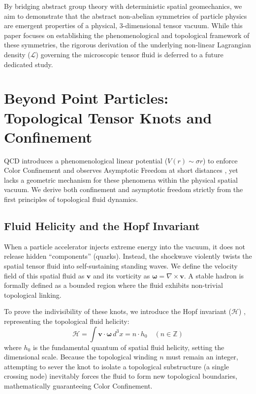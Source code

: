 \documentclass[reprint,amsmath,amssymb,aps,prd]{revtex4-2}
\begin{document}
By bridging abstract group theory with deterministic spatial geomechanics, we aim to demonstrate that the abstract non-abelian symmetries of particle physics are emergent properties of a physical, 3-dimensional tensor vacuum. While this paper focuses on establishing the phenomenological and topological framework of these symmetries, the rigorous derivation of the underlying non-linear Lagrangian density ($\mathcal{L}$) governing the microscopic tensor fluid is deferred to a future dedicated study.

\section{Beyond Point Particles: Topological Tensor Knots and Confinement}

QCD introduces a phenomenological linear potential ($V(r) \sim \sigma r$) to enforce Color Confinement and observes Asymptotic Freedom at short distances \cite{Gross1973}, yet lacks a geometric mechanism for these phenomena within the physical spatial vacuum. We derive both confinement and asymptotic freedom strictly from the first principles of topological fluid dynamics.

\subsection{Fluid Helicity and the Hopf Invariant}
When a particle accelerator injects extreme energy into the vacuum, it does not release hidden ``components'' (quarks). Instead, the shockwave violently twists the spatial tensor fluid into self-sustaining standing waves. We define the velocity field of this spatial fluid as $\mathbf{v}$ and its vorticity as $\boldsymbol{\omega} = \nabla \times \mathbf{v}$. A stable hadron is formally defined as a bounded region where the fluid exhibits non-trivial topological linking.

To prove the indivisibility of these knots, we introduce the Hopf invariant ($\mathcal{H}$) \cite{Moffatt1969}, representing the topological fluid helicity:
\begin{equation}
\mathcal{H} = \int \mathbf{v} \cdot \boldsymbol{\omega} \, d^3x = n \cdot h_0 \quad (n \in \mathbb{Z})
\end{equation}
where $h_0$ is the fundamental quantum of spatial fluid helicity, setting the dimensional scale. Because the topological winding $n$ must remain an integer, attempting to sever the knot to isolate a topological substructure (a single crossing node) inevitably forces the fluid to form new topological boundaries, mathematically guaranteeing Color Confinement.
\end{document}
